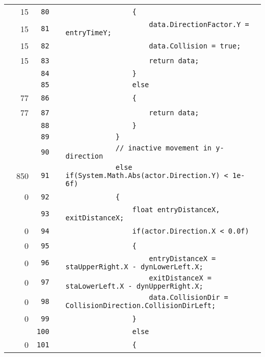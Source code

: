 \documentclass[a4paper,landscape,10pt]{article}
\begin{document}
\begin{longtable}[l]{lrrll}
\cellcolor{green} & 15 & \verb~80~ & & \verb~                {~\\
\cellcolor{green} & 15 & \verb~81~ & & \verb~                    data.DirectionFactor.Y = entryTimeY;~\\
\cellcolor{green} & 15 & \verb~82~ & & \verb~                    data.Collision = true;~\\
\cellcolor{green} & 15 & \verb~83~ & & \verb~                    return data;~\\
\cellcolor{gray} &  & \verb~84~ & & \verb~                }~\\
\cellcolor{gray} &  & \verb~85~ & & \verb~                else~\\
\cellcolor{green} & 77 & \verb~86~ & & \verb~                {~\\
\cellcolor{green} & 77 & \verb~87~ & & \verb~                    return data;~\\
\cellcolor{gray} &  & \verb~88~ & & \verb~                }~\\
\cellcolor{gray} &  & \verb~89~ & & \verb~            }~\\
\cellcolor{gray} &  & \verb~90~ & & \verb~            // inactive movement in y-direction~\\
\cellcolor{orange} & 850 & \verb~91~ & & \verb~            else if(System.Math.Abs(actor.Direction.Y) < 1e-6f)~\\
\cellcolor{red} & 0 & \verb~92~ & & \verb~            {~\\
\cellcolor{gray} &  & \verb~93~ & & \verb~                float entryDistanceX, exitDistanceX;~\\
\cellcolor{red} & 0 & \verb~94~ & & \verb~                if(actor.Direction.X < 0.0f)~\\
\cellcolor{red} & 0 & \verb~95~ & & \verb~                {~\\
\cellcolor{red} & 0 & \verb~96~ & & \verb~                    entryDistanceX = staUpperRight.X - dynLowerLeft.X;~\\
\cellcolor{red} & 0 & \verb~97~ & & \verb~                    exitDistanceX = staLowerLeft.X - dynUpperRight.X;~\\
\cellcolor{red} & 0 & \verb~98~ & & \verb~                    data.CollisionDir = CollisionDirection.CollisionDirLeft;~\\
\cellcolor{red} & 0 & \verb~99~ & & \verb~                }~\\
\cellcolor{gray} &  & \verb~100~ & & \verb~                else~\\
\cellcolor{red} & 0 & \verb~101~ & & \verb~                {~\\

\end{longtable}
\end{document}
